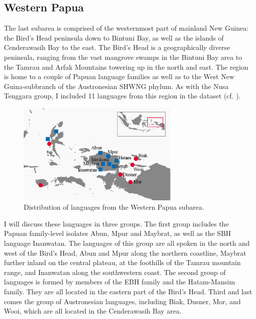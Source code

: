 \subsection{Western Papua}\label{sec:westpapua2}

The last subarea is comprised of the westernmost part of mainland New Guinea: the Bird's Head peninsula down to Bintuni Bay, as well as the islands of Cenderawasih Bay to the east. The Bird's Head is a geographically diverse peninsula, ranging from the vast mangrove swamps in the Bintuni Bay area to the Tamrau and Arfak Mountains towering up in the north and east. The region is home to a couple of Papuan language families as well as to the West New Guina-subbranch of the Austronesian SHWNG phylum. As with the Nusa Tenggara group, I included 11 languages from this region in the dataset (cf. ). 

\begin{figure}

\includegraphics[width=0.7\textwidth]{figures/Map_Papua2.eps}
\caption{Distribution of languages from the Western Papua subarea.}\label{map:Pap}

\end{figure}

I will discuss these languages in three groups. The first group includes the Papuan family-level isolates Abun, Mpur and Maybrat, as well as the \textsc{SBH} language Inanwatan. The languages of this group are all spoken in the north and west of the Bird's Head, Abun and Mpur along the northern coastline, Maybrat further inland on the central plateau, at the foothills of the Tamrau mountain range, and Inanwatan along the southwestern coast. The second group of languages is formed by members of the EBH family and the Hatam-Mansim family. They are all located in the eastern part of the Bird's Head. Third and last comes the group of Austronesian languages, including Biak, Dusner, Mor, and Wooi, which are all located in the Cenderawasih Bay area.

